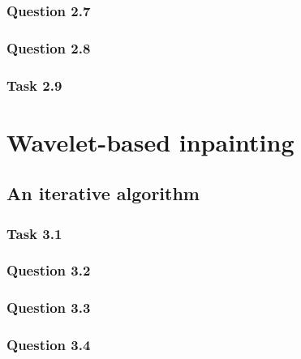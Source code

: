 \documentclass[a4paper]{article}
\begin{document}
    \subsubsection{Question 2.7}

    \subsubsection{Question 2.8}

    \subsubsection{Task 2.9}

    \section{Wavelet-based inpainting}

    \subsection{An iterative algorithm}

    \subsubsection{Task 3.1}

    \subsubsection{Question 3.2}

    \subsubsection{Question 3.3}

    \subsubsection{Question 3.4}

 
\end{document}
